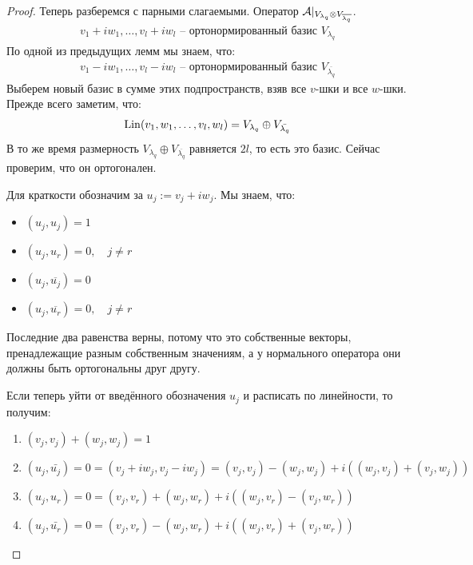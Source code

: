 \begin{theorem}
\begin{proof}
    Теперь разберемся с парными слагаемыми. Оператор 
    $\mathcal{A} |_{V_{\lambda_q} \otimes V_{\overline{\lambda_{q}}}}$. 
    \begin{gather*}
        v_1 + iw_1, \dots, v_l + iw_l \text{ -- ортонормированный базис } V_{\lambda_q}
    \end{gather*}
    По одной из предыдущих лемм мы знаем, что:
    \begin{gather*}
        v_1 - iw_1, \dots, v_l - iw_l \text{ -- ортонормированный базис } V_{\overline{\lambda_q}}
    \end{gather*}
    Выберем новый базис в сумме этих подпространств, взяв все $v$-шки и все $w$-шки. Прежде всего заметим, что:
    \begin{gather*}
        \operatorname{Lin} (v_1, w_1, \dots, v_l, w_l) = V_{\lambda_q} \oplus V_{\bar{\lambda_q}}
    \end{gather*}
    В то же время размерность $V_{\lambda_q} \oplus V_{\overline{\lambda_{q}}}$ равняется $2l$, то есть это базис. 
    Сейчас проверим, что он ортогонален.

    Для краткости обозначим за $u_j := v_j + iw_j$. Мы знаем, что:
    \begin{itemize}
        \item $(u_j, u_j) = 1$
        \item $(u_j, u_r) = 0, \quad j \neq r$
        \item $(u_j, \overline{u_j}) = 0$
        \item $(u_j, \overline{u_r}) = 0, \quad j \neq r$
    \end{itemize}
    Последние два равенства верны, потому что это собственные векторы, пренадлежащие разным собственным значениям, 
    а у нормального оператора они должны быть ортогональны друг другу.

    Если теперь уйти от введённого обозначения $u_j$ и расписать по линейности, то получим:
    \begin{enumerate}
        \item $ (v_j, v_j) + (w_j, w_j) = 1  $
        \item $ (u_j, \bar{u_j}) = 0 = (v_j + iw_j, v_j - iw_j) = (v_j, v_j) - (w_j, w_j) + i ( (w_j, v_j) + (v_j, w_j) )$
        \item $(u_j, u_r) = 0 = (v_j, v_r) + (w_j, w_r) + i ( (w_j, v_r ) - (v_j, w_r) )$
        \item $(u_j, \bar{u_r}) = 0 = (v_j, v_r) - (w_j, w_r) + i ( (w_j, v_r ) + (v_j, w_r) )$
    \end{enumerate}
    

\end{proof}
\end{theorem}
